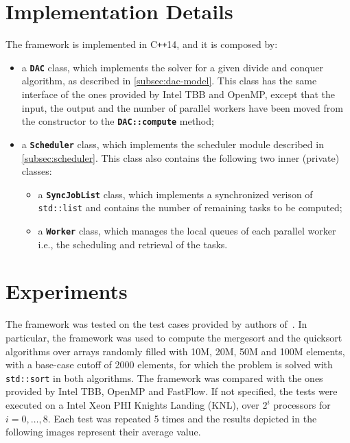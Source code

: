 \documentclass[11pt, a4paper]{article}
\begin{document}
\section{Implementation Details}\label{sec:implementation}

The framework is implemented in C{\tt ++}14, and it is composed by:
%
\begin{itemize}
	\item a {\tt\bfseries DAC} class, which implements the solver for a given divide and conquer algorithm, as described in \autoref{subsec:dac-model}. This class has the same interface of the ones provided by Intel TBB and OpenMP, except that the input, the output and the number of parallel workers have been moved from the constructor to the {\tt\bfseries DAC::compute} method;
	\item a {\tt\bfseries Scheduler} class, which implements the scheduler module described in \autoref{subsec:scheduler}. This class also contains the following two inner (private) classes:
	\begin{itemize}
		\item a {\tt\bfseries SyncJobList} class, which implements a synchronized verison of {\tt std::list} and contains the number of remaining tasks to be computed;
		\item a {\tt\bfseries Worker} class, which manages the local queues of each parallel worker i.e., the scheduling and retrieval of the tasks.
	\end{itemize}
\end{itemize}


\section{Experiments}\label{sec:experiments}

The framework was tested on the test cases provided by authors of~\cite{danelutto2016divide}. In particular, the framework was used to compute the mergesort and the quicksort algorithms over arrays randomly filled with 10M, 20M, 50M and 100M elements, with a base-case cutoff of 2000 elements, for which the problem is solved with {\tt std::sort} in both algorithms. The framework was compared with the ones provided by Intel TBB, OpenMP and FastFlow. If not specified, the tests were executed on a Intel Xeon PHI Knights Landing (KNL), over $2^i$ processors for $i = 0, \dots, 8$. Each test was repeated 5 times and the results depicted in the following images represent their average value. 
\end{document}
